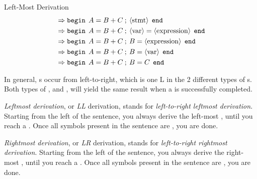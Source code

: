 \begin{example}[]{Left-Most Derivation}
\begin{align*}
                          &\Rightarrow \mathtt{begin} \:\: A = B + C\: ; \: \langle \text{stmt} \rangle \:\: \mathtt{end} \\
                          &\Rightarrow \mathtt{begin} \:\: A = B + C\: ; \: \langle \text{var} \rangle = \langle \text{expression} \rangle \:\: \mathtt{end} \\
                          &\Rightarrow \mathtt{begin} \:\: A = B + C\: ; \: B = \langle \text{expression} \rangle \:\: \mathtt{end} \\
                          &\Rightarrow \mathtt{begin} \:\: A = B + C\: ; \: B = \langle \text{var} \rangle \:\: \mathtt{end} \\
                          &\Rightarrow \mathtt{begin} \:\: A = B + C\: ; \: B = C \:\: \mathtt{end} 
  \end{align*}
\end{example}

In general, s occur from left-to-right, which is one L in the 2 different types of s.
Both types of ,  and , will yield the same result when a  is successfully completed.

\begin{definition}\label{def:Leftmost_Derivation}
  \emph{Leftmost derivation}, or \emph{LL} derivation, stands for \emph{left-to-right leftmost derivation}.
  Starting from the left of the sentence, you always derive the left-most , until you reach a .
  Once all symbols present in the sentence are , you are done.
\end{definition}

\begin{definition}\label{def:Rightmost_Derivation}
  \emph{Rightmost derivation}, or \emph{LR} derivation, stands for \emph{left-to-right rightmost derivation}.
  Starting from the left of the sentence, you always derive the right-most , until you reach a .
  Once all symbols present in the sentence are , you are done.
\end{definition}

